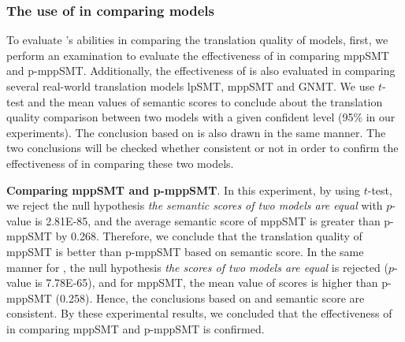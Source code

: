 \subsubsection{The use of {\model} in comparing models}
To evaluate {\model}'s abilities in comparing the translation quality of models, 
first, we perform an examination to evaluate the effectiveness of {\model} in 
comparing mppSMT and p-mppSMT. Additionally, the effectiveness of {\model} is 
also evaluated in comparing several real-world translation models lpSMT, mppSMT and GNMT.
%
We use $t$-test and the mean values of semantic scores to conclude about the translation 
quality comparison between two models with a given confident level (95\% in our experiments). 
The conclusion based on {\model} is also drawn in the same manner. The two conclusions will 
be checked whether consistent or not in order to confirm the effectiveness of {\model} 
in comparing these two models. 

\textbf{Comparing mppSMT and p-mppSMT}. In this experiment, by using $t$-test, we reject the null
hypothesis \textit{the semantic scores of two models are equal} with $p$-value is 2.81E-85, and
the average semantic score of mppSMT is greater than p-mppSMT by 0.268. Therefore, we conclude that
the translation quality of mppSMT is better than p-mppSMT based on semantic score. In the same manner
for {\model}, the null hypothesis \textit{the {\model} scores of two models are equal} is rejected 
($p$-value is 7.78E-65), and for mppSMT, the mean value of {\model} scores is higher than p-mppSMT (0.258).
Hence, the conclusions based on {\model} and semantic score are consistent. By these experimental results, 
we concluded that the effectiveness of {\model} in comparing mppSMT and p-mppSMT is confirmed.

